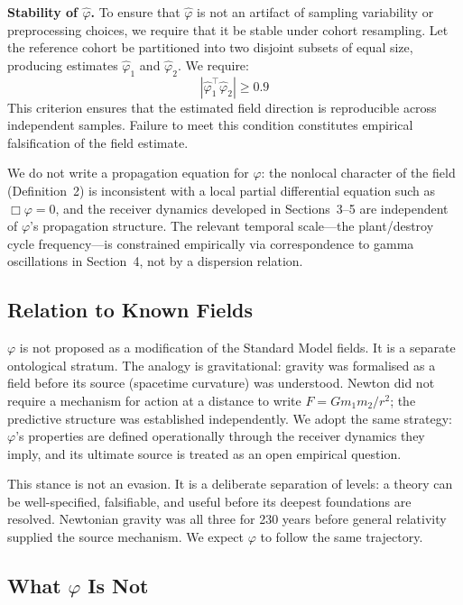 \documentclass[12pt]{article}
\begin{document}
\textbf{Stability of $\hat{\varphi}$.}
To ensure that $\hat{\varphi}$ is not an artifact of sampling variability or preprocessing choices, we require that it be stable under cohort resampling. Let the reference cohort be partitioned into two disjoint subsets of equal size, producing estimates $\hat{\varphi}_1$ and $\hat{\varphi}_2$. We require:
\begin{equation}
    \left| \hat{\varphi}_1^\top \hat{\varphi}_2 \right| \geq 0.9
\end{equation}
This criterion ensures that the estimated field direction is reproducible across independent samples. Failure to meet this condition constitutes empirical falsification of the field estimate.

We do not write a propagation equation for $\varphi$: the nonlocal character of the field (Definition~2) is inconsistent with a local partial differential equation such as $\Box\varphi = 0$, and the receiver dynamics developed in Sections~3--5 are independent of $\varphi$'s propagation structure. The relevant temporal scale---the plant/destroy cycle frequency---is constrained empirically via correspondence to gamma oscillations in Section~4, not by a dispersion relation.

\subsection{Relation to Known Fields}

$\varphi$ is not proposed as a modification of the Standard Model fields. It is a separate ontological stratum. The analogy is gravitational: gravity was formalised as a field before its source (spacetime curvature) was understood. Newton did not require a mechanism for action at a distance to write $F = Gm_1m_2/r^2$; the predictive structure was established independently. We adopt the same strategy: $\varphi$'s properties are defined operationally through the receiver dynamics they imply, and its ultimate source is treated as an open empirical question.

This stance is not an evasion. It is a deliberate separation of levels: a theory can be well-specified, falsifiable, and useful before its deepest foundations are resolved. Newtonian gravity was all three for 230 years before general relativity supplied the source mechanism. We expect $\varphi$ to follow the same trajectory.

\subsection{What \texorpdfstring{$\varphi$}{phi} Is Not}
\end{document}
